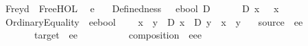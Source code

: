 %
\begin{isabellebody}%
%
%
\isadelimtheory
%
\endisadelimtheory
%
\isatagtheory
{}\isamarkupfalse%
\ Freyd\ \ FreeHOL\ \isanewline
{}%
\endisatagtheory
{\isafoldtheory}%
%
\isadelimtheory
\isanewline
%
\endisadelimtheory
\isanewline
{}\isamarkupfalse%
\ e\ \ %
\isanewline
{}\isamarkupfalse%
\ Definedness\ {\isacharcolon}{\isacharcolon}\ \ {\isachardoublequoteopen}e{\isasymRightarrow}bool{\isachardoublequoteclose}\ {\isacharparenleft}{\isachardoublequoteopen}D{\isacharunderscore}{\isachardoublequoteclose}{\isacharbrackleft}{}{\isacharbrackright}{}{}{\isacharparenright}\ \ \ \ \isanewline
\ \ {\isachardoublequoteopen}D\ x\ {\isasymequiv}\ {\isasymA}\ x{\isachardoublequoteclose}\ \ \ \isanewline
{}\isamarkupfalse%
\ OrdinaryEquality\ {\isacharcolon}{\isacharcolon}\ {\isachardoublequoteopen}e{\isasymRightarrow}e{\isasymRightarrow}bool{\isachardoublequoteclose}\ {\isacharparenleft}\ \isanewline
\ \ {\isachardoublequoteopen}x\ {\isasymapprox}\ y\ {\isasymequiv}\ {\isacharparenleft}{\isacharparenleft}D\ x{\isacharparenright}\ \isactrlbold {\isasymleftrightarrow}\ {\isacharparenleft}D\ y{\isacharparenright}{\isacharparenright}\ \isactrlbold {\isasymand}\ x\ \isactrlbold {\isacharequal}\ y{\isachardoublequoteclose}\ \ \isanewline
\isanewline
{}\isamarkupfalse%
\ source\ {\isacharcolon}{\isacharcolon}\ {\isachardoublequoteopen}e{\isasymRightarrow}e{\isachardoublequoteclose}\ {\isacharparenleft}{\isachardoublequoteopen}{\isasymbox}{\isacharunderscore}{\isachardoublequoteclose}\ {\isacharbrackleft}{}{}{}{\isacharbrackright}{}{}{}{\isacharparenright}\ \isanewline
\ \ \ \ \ \ \ target\ {\isacharcolon}{\isacharcolon}\ {\isachardoublequoteopen}e{\isasymRightarrow}e{\isachardoublequoteclose}\ {\isacharparenleft}{\isachardoublequoteopen}{\isacharunderscore}{\isasymbox}{\isachardoublequoteclose}\ {\isacharbrackleft}{}{}{}{\isacharbrackright}{}{}{}{\isacharparenright}\ \isanewline
\ \ \ \ \ \ \ composition\ {\isacharcolon}{\isacharcolon}\ {\isachardoublequoteopen}e{\isasymRightarrow}e{\isasymRightarrow}e{\isachardoublequoteclose}\ {\isacharparenleft}\ {\isachardoublequoteopen}{\isasymcdot}{\isachardoublequoteclose}\ {}{}{}{\isacharparenright}\isanewline

\end{isabellebody}

